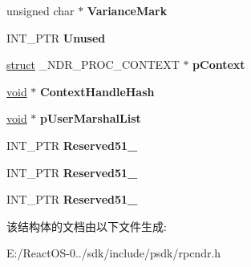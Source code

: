 \begin{DoxyCompactItemize}
unsigned char $\ast$ {\bfseries Variance\+Mark}
\item 
\mbox{\label{struct___m_i_d_l___s_t_u_b___m_e_s_s_a_g_e_a954e1133a1ac8d6c43f8c1174f9bedfe}} 
I\+N\+T\+\_\+\+P\+TR {\bfseries Unused}
\item 
\mbox{\label{struct___m_i_d_l___s_t_u_b___m_e_s_s_a_g_e_ae9c55c6ac54758f4e831e0345b3dc2bc}} 
\hyperlink{interfacestruct}{struct} \+\_\+\+N\+D\+R\+\_\+\+P\+R\+O\+C\+\_\+\+C\+O\+N\+T\+E\+XT $\ast$ {\bfseries p\+Context}
\item 
\mbox{\label{struct___m_i_d_l___s_t_u_b___m_e_s_s_a_g_e_a83ffbb58aefe9f6653a5ddc2ef5bb204}} 
\hyperlink{interfacevoid}{void} $\ast$ {\bfseries Context\+Handle\+Hash}
\item 
\mbox{\label{struct___m_i_d_l___s_t_u_b___m_e_s_s_a_g_e_a8558fbccb5b8aef478652ced7198ee3c}} 
\hyperlink{interfacevoid}{void} $\ast$ {\bfseries p\+User\+Marshal\+List}
\item 
\mbox{\label{struct___m_i_d_l___s_t_u_b___m_e_s_s_a_g_e_a9165a87b256a89ed6a017c793352ce11}} 
I\+N\+T\+\_\+\+P\+TR {\bfseries Reserved51\+\_}
\item 
\mbox{\label{struct___m_i_d_l___s_t_u_b___m_e_s_s_a_g_e_adb3c88a334e91b71146bfefcd59dc61e}} 
I\+N\+T\+\_\+\+P\+TR {\bfseries Reserved51\+\_}
\item 
\mbox{\label{struct___m_i_d_l___s_t_u_b___m_e_s_s_a_g_e_a2bf3f47154e74b58e55fd8f3422dd5b6}} 
I\+N\+T\+\_\+\+P\+TR {\bfseries Reserved51\+\_}
\end{DoxyCompactItemize}


该结构体的文档由以下文件生成\+:\begin{DoxyCompactItemize}
\item 
E\+:/\+React\+O\+S-\/0../sdk/include/psdk/rpcndr.\+h\end{DoxyCompactItemize}
